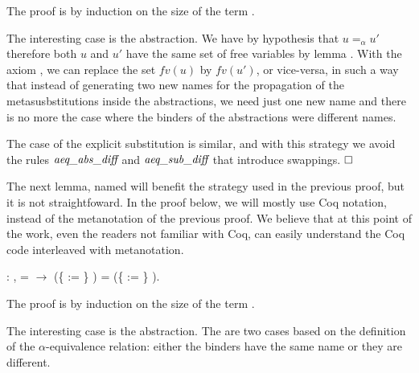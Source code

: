  The proof is by induction on the size of the term .
\begin{coqdoccode}
\end{coqdoccode}
The interesting case is the abstraction. We have by hypothesis that $u =_\alpha u'$ therefore both $u$ and $u'$ have the same set of free variables by lemma . With the axiom , we can replace the set $fv(u)$ by $fv(u')$, or vice-versa, in such a way that instead of generating two new names for the propagation of the metasusbstitutions inside the abstractions, we need just one new name and there is no more the case where the binders of the abstractions were different names. 
\begin{coqdoccode}
\end{coqdoccode}
The case of the explicit substitution is similar, and with this strategy we avoid the rules $\mbox{\it aeq}\_\mbox{\it abs}\_\mbox{\it diff}$ and $\mbox{\it aeq}\_\mbox{\it sub}\_\mbox{\it diff}$ that introduce swappings. $\hfill\Box$
\begin{coqdoccode}
\end{coqdoccode}
\newline 
\begin{coqdoccode}
\coqdocemptyline
\coqdocemptyline
\end{coqdoccode}
The next lemma, named  will benefit the strategy used in the previous proof, but it is not straightfoward. In the proof below, we will mostly use Coq notation, instead of the metanotation of the previous proof. We believe that at this point of the work, even the readers not familiar with Coq, can easily understand the Coq code interleaved with metanotation. 
\begin{coqdoccode}
\coqdocnoindent
{} : \coqdockw{\ensuremath{\forall}}    ,  =  \ensuremath{\rightarrow} (\{ := \} ) = (\{ := \} ).\coqdoceol
\end{coqdoccode}
 The proof is by induction on the size of the term . 
\begin{coqdoccode}
\end{coqdoccode}
The interesting case is the abstraction. The are two cases based on the definition of the $\alpha$-equivalence relation: either the binders have the same name or they are different. 

